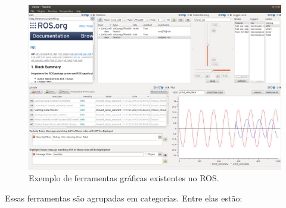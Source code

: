             \begin{figure}[htb]
                \centering
                \includegraphics[width=\textwidth]{Figuras/2_revisao/ros_gui.png}
                \caption{Exemplo de ferramentas gráficas existentes no ROS.}
                \label{fig:ros_gui}
            \end{figure}
            
            Essas ferramentas são agrupadas em categorias. Entre elas estão: 
            
